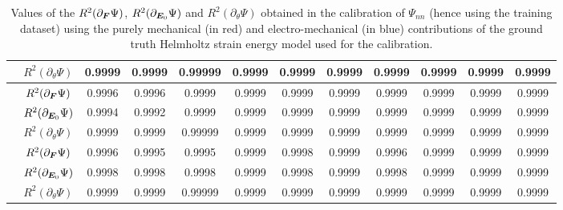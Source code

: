 \begin{table}[hbtp!]
\begin{tabular}{c c c c c c c c c c c c}
&$R^2(\partial_{\theta}\Psi)$ & 0.9999 &  0.9999 & 0.99999 & 0.9999 & 0.9999 & 0.9999 & 0.9999 & 0.9999 & 0.9999 & 0.9999\\	
\midrule
		\multirow{3}{*}{\rotatebox{90}{\textcolor{red}{\textbf{TI}}/\textcolor{blue}{\textbf{ID}}}} &$R^2(\partial_{\boldsymbol{F}}\Psi)$ & 0.9996 & 0.9996 & 0.9999 & 0.9999&  0.9999&  0.9999 & 0.9999 & 0.9999 & 0.9999 & 0.9999\\
&$R^2(\partial_{\boldsymbol{E}_0}\Psi)$ &  0.9994 & 0.9992 & 0.9999 & 0.9999 & 0.9999 & 0.9999 & 0.9999 & 0.9999 & 0.9999 & 0.9999\\
&$R^2(\partial_{\theta}\Psi)$ & 0.9999 &  0.9999 & 0.99999 & 0.9999 & 0.9999 & 0.9999 & 0.9999 & 0.9999 & 0.9999 & 0.9999\\	
\midrule
		\multirow{3}{*}{\rotatebox{90}{\textcolor{red}{\textbf{MR}}/\textcolor{blue}{\textbf{ES}}}} &$R^2(\partial_{\boldsymbol{F}}\Psi)$ &  0.9996 &  0.9995 & 0.9995 & 0.9999 & 0.9998 & 0.9999 & 0.9996 & 0.9999 & 0.9999 & 0.9999\\
&$R^2(\partial_{\boldsymbol{E}_0}\Psi)$ & 0.9998 & 0.9998 & 0.9998 & 0.9999 & 0.9998 & 0.9999 & 0.9998 & 0.9999 & 0.9999 & 0.9999\\
&$R^2(\partial_{\theta}\Psi)$ & 0.9999 &  0.9999 & 0.99999 & 0.9999 & 0.9999 & 0.9999 & 0.9999 & 0.9999 & 0.9999 & 0.9999\\	
\midrule
	\end{tabular}
	\caption{Values of the $R^2(\partial_{\boldsymbol{F}}\Psi)$, $R^2(\partial_{\boldsymbol{E}_0}\Psi)$ and $R^2(\partial_{\theta}\Psi)$ obtained in the calibration of $\Psi_{nn}$ (hence using the training dataset) using the purely mechanical (in red) and electro-mechanical (in blue) contributions of the ground truth Helmholtz strain energy model used for the calibration.}
	\label{table: results calibration strategy 1}
\end{table}

